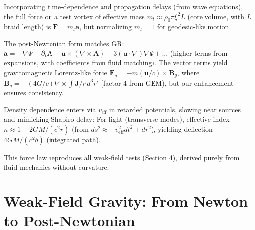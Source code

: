 Incorporating time-dependence and propagation delays (from wave equations), the full force on a test vortex of effective mass $m_t \approx \rho_0 \pi \xi^2 L$ (core volume, with $L$ braid length) is $\mathbf{F} = m_t \mathbf{a}$, but normalizing $m_t =1$ for geodesic-like motion.

The post-Newtonian form matches GR: $\mathbf{a} = - \nabla \Psi - \partial_t \mathbf{A} - \mathbf{u} \times (\nabla \times \mathbf{A}) + 3 (\mathbf{u} \cdot \nabla) \nabla \Psi + ...$ (higher terms from expansions, with coefficients from fluid matching). The vector terms yield gravitomagnetic Lorentz-like force $\mathbf{F}_g = - m (\mathbf{u} / c) \times \mathbf{B}_g$, where $\mathbf{B}_g = - (4 G / c) \nabla \times \int \mathbf{J} / r \, d^3 r'$ (factor 4 from GEM), but our enhancement ensures consistency.

Density dependence enters via $v_{\text{eff}}$ in retarded potentials, slowing near sources and mimicking Shapiro delay: For light (transverse modes), effective index $n \approx 1 + 2 G M / (c^2 r)$ (from $ds^2 \approx - v_{\text{eff}}^2 dt^2 + dr^2$), yielding deflection $4 G M / (c^2 b)$ (integrated path).

This force law reproduces all weak-field tests (Section 4), derived purely from fluid mechanics without curvature.

\medskip
\noindent
{}
\medskip

\section{Weak-Field Gravity: From Newton to Post-Newtonian}

